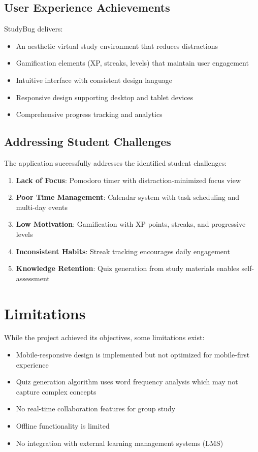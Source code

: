 \subsection{User Experience Achievements}
StudyBug delivers:
\begin{itemize}
    \item An aesthetic virtual study environment that reduces distractions
    \item Gamification elements (XP, streaks, levels) that maintain user engagement
    \item Intuitive interface with consistent design language
    \item Responsive design supporting desktop and tablet devices
    \item Comprehensive progress tracking and analytics
\end{itemize}

\subsection{Addressing Student Challenges}
The application successfully addresses the identified student challenges:
\begin{enumerate}
    \item \textbf{Lack of Focus}: Pomodoro timer with distraction-minimized focus view
    \item \textbf{Poor Time Management}: Calendar system with task scheduling and multi-day events
    \item \textbf{Low Motivation}: Gamification with XP points, streaks, and progressive levels
    \item \textbf{Inconsistent Habits}: Streak tracking encourages daily engagement
    \item \textbf{Knowledge Retention}: Quiz generation from study materials enables self-assessment
\end{enumerate}

\section{Limitations}
While the project achieved its objectives, some limitations exist:
\begin{itemize}
    \item Mobile-responsive design is implemented but not optimized for mobile-first experience
    \item Quiz generation algorithm uses word frequency analysis which may not capture complex concepts
    \item No real-time collaboration features for group study
    \item Offline functionality is limited
    \item No integration with external learning management systems (LMS)
\end{itemize}

